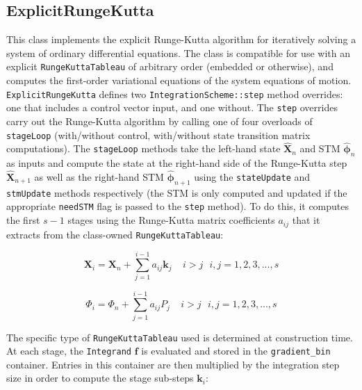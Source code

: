 \subsection{ExplicitRungeKutta}
\label{sec:ExplicitRungeKutta}

This class implements the explicit Runge-Kutta algorithm for iteratively solving a system of ordinary differential equations. The class is compatible for use with an explicit \texttt{RungeKuttaTableau} of arbitrary order (embedded or otherwise), and computes the first-order variational equations of the system equations of motion. \\

\texttt{ExplicitRungeKutta} defines two \texttt{IntegrationScheme::step} method overrides: one that includes a control vector input, and one without. The \texttt{step} overrides carry out the Runge-Kutta algorithm by calling one of four overloads of \texttt{stageLoop} (with/without control, with/without state transition matrix computations). The \texttt{stageLoop} methods take the left-hand state $\hat{\mathbf{X}}_{n}$ and STM $\hat{\mathbf{\phi}}_{n}$ as inputs and compute the state at the right-hand side of the Runge-Kutta step $\hat{\mathbf{X}}_{n+1}$ as well as the right-hand STM $\hat{\mathbf{\phi}}_{n+1}$ using the \texttt{stateUpdate} and \texttt{stmUpdate} methods respectively (the STM is only computed and updated if the appropriate \texttt{needSTM} flag is passed to the \texttt{step} method). To do this, it computes the first $s-1$ stages using the Runge-Kutta matrix coefficients $a_{ij}$ that it extracts from the class-owned \texttt{RungeKuttaTableau}:

\begin{equation}
\label{eq:X_stage_i}
\mathbf{X}_{i} = \mathbf{X}_n + \sum^{i-1}_{j=1} a_{ij} \mathbf{k}_j ~~~~~ i > j ~~~ i,j = 1,2,3,...,s 
\end{equation}

\begin{equation}
\label{eq:phi_stage_i}
\Phi_{i} = \Phi_n + \sum^{i-1}_{j=1} a_{ij} P_j ~~~~~ i > j ~~~ i,j = 1,2,3,...,s 
\end{equation}

\noindent The specific type of \texttt{RungeKuttaTableau} used is determined at construction time. At each stage, the \texttt{Integrand} $\mathbf{f}$ is evaluated and stored in the \texttt{gradient\_bin} container. Entries in this container are then multiplied by the integration step size in order to compute the stage sub-steps $\mathbf{k}_i$:

